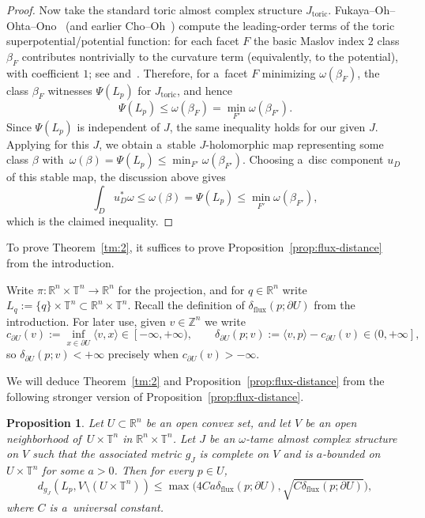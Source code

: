 \documentclass[10pt,a4paper]{amsart}
\numberwithin{equation}{section}
\newcommand{\bR}{{\mathbb R}}
\newcommand{\bZ}{{\mathbb Z}}
\newcommand{\bT}{{\mathbb T}}
\newtheorem{Proposition}[Theorem]{Proposition}
\theoremstyle{definition}
\begin{document}
\begin{proof}
Now take the standard toric almost complex structure $J_{\mathrm{toric}}$.
Fukaya--Oh--Ohta--Ono~\cite{FOOO_Toric1} (and earlier Cho--Oh~\cite{ChoOhToric}) compute the leading-order terms of the toric superpotential/potential function: for each facet $F$ the basic Maslov index $2$ class $\beta_F$ contributes nontrivially to the curvature term (equivalently, to the potential), with coefficient $1$; see \cite[Section~11]{FOOO_Toric1} and~\cite{ChoOhToric}.
Therefore, for a~facet $F$ minimizing $\omega(\beta_F)$, the class $\beta_F$ witnesses $\Psi(L_p)$ for $J_{\mathrm{toric}}$, and hence
\[
\Psi(L_p) \le \omega(\beta_F) = \min_{F'}\omega(\beta_{F'}).
\]
Since $\Psi(L_p)$ is independent of $J$, the same inequality holds for our given $J$.
Applying \cite[Theorem~4.8]{STVFluxShape} for this $J$, we obtain a~stable $J$-holomorphic map representing some class $\beta$ with~${\omega(\beta)=\Psi(L_p)\le \min_{F'}\omega(\beta_{F'})}$.
Choosing a~disc component $u_D$ of this stable map, the discussion above gives
\[
\int_D u_D^*\omega\le \omega(\beta)=\Psi(L_p)\le \min_{F'}\omega(\beta_{F'}),
\]
which is the claimed inequality.
\end{proof}

To prove Theorem~\ref{tm:2}, it suffices to prove Proposition~\ref{prop:flux-distance} from the introduction.

Write $\pi\colon \bR^{n}\times\bT^{n}\to \bR^{n}$ for the projection, and for $q\in\bR^n$ write $L_q:=\{q\}\times\bT^n\subset \bR^n\times\bT^n$.
Recall the definition of $\delta_{\mathrm{flux}}(p;\partial U)$ from the introduction.
For later use, given $v\in\bZ^n$ we write
\[
c_{\partial U}(v):=\inf_{x\in \partial U}\langle v,x\rangle\in[-\infty,+\infty),
\qquad
\delta_{\partial U}(p;v):=\langle v,p\rangle-c_{\partial U}(v)\in(0,+\infty],
\]
so $\delta_{\partial U}(p;v)<+\infty$ precisely when $c_{\partial U}(v)>-\infty$.

We will deduce Theorem~\ref{tm:2} and Proposition~\ref{prop:flux-distance} from the following stronger version of Proposition~\ref{prop:flux-distance}.

\begin{Proposition}\label{prop:flux-distance-strong}
Let $U\subset\bR^n$ be an open convex set, and let $V$ be an open neighborhood of~${U\times\bT^n}$ in $\bR^n\times\bT^n$. Let $J$ be an $\omega$-tame almost complex structure on $V$ such that the associated metric $g_J$ is complete on $V$ and is $a$-bounded on $U\times\bT^n$ for some $a>0$. Then for every $p\in U$,
\[
 d_{g_J}(L_p, V\setminus (U\times\bT^n)) \le\max\bigl(4Ca\delta_{\mathrm{flux}}(p;\partial U),\sqrt{C\delta_{\mathrm{flux}}(p;\partial U)}\bigr),
\]
where $C$ is a~universal constant.
\end{Proposition}
\end{document}
